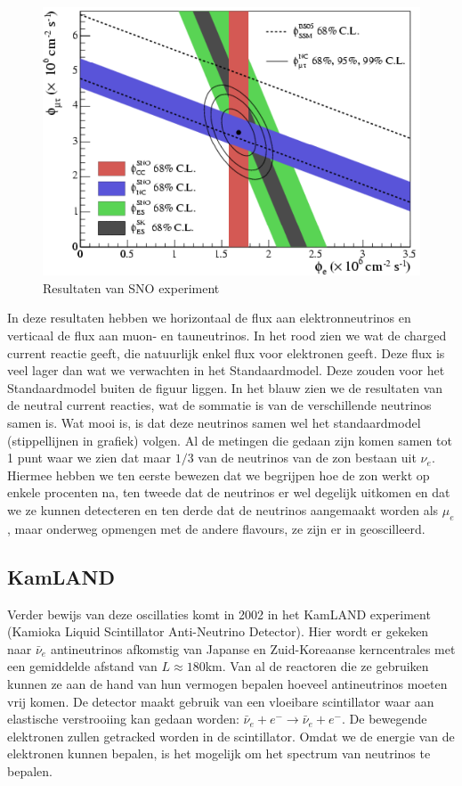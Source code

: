 \documentclass[../main.tex]{subfiles}
\begin{document}
\begin{figure}[h]
    \centering
    \includegraphics[width=0.5\linewidth]{neutrinos/sno_resultaten.png}
    \caption{Resultaten van SNO experiment}%
    \label{fig:neutrinos/sno_resultaten}
\end{figure}

In deze resultaten hebben we horizontaal de flux aan elektronneutrinos en verticaal de flux aan muon- en tauneutrinos. In het rood zien we wat de charged current reactie geeft, die natuurlijk enkel flux voor elektronen geeft. Deze flux is veel lager dan wat we verwachten in het Standaardmodel. Deze zouden voor het Standaardmodel buiten de figuur liggen. In het blauw zien we de resultaten van de neutral current reacties, wat de sommatie is van de verschillende neutrinos samen is. Wat mooi is, is dat deze neutrinos samen wel het standaardmodel (stippellijnen in grafiek) volgen. Al de metingen die gedaan zijn komen samen tot 1 punt waar we zien dat maar $1/3$ van de neutrinos van de zon bestaan uit $\nu_e$.\\
Hiermee hebben we ten eerste bewezen dat we begrijpen hoe de zon werkt op enkele procenten na, ten tweede dat de neutrinos er wel degelijk uitkomen en dat we ze kunnen detecteren en ten derde dat de neutrinos aangemaakt worden als $\mu_e$, maar onderweg opmengen met de andere flavours, ze zijn er in geoscilleerd.

\subsection{KamLAND}%
\label{sub:kamland}

Verder bewijs van deze oscillaties komt in 2002 in het KamLAND experiment (Kamioka Liquid Scintillator Anti-Neutrino
Detector). Hier wordt er gekeken naar $\bar{\nu}_e$ antineutrinos afkomstig van Japanse en Zuid-Koreaanse kerncentrales met een gemiddelde afstand van $L\approx180$km. Van al de reactoren die ze gebruiken kunnen ze aan de hand van hun vermogen bepalen hoeveel antineutrinos moeten vrij komen. De detector maakt gebruik van een vloeibare scintillator waar aan elastische verstrooiing kan gedaan worden: $\bar{\nu}_{e}+e^{-} \rightarrow \bar{\nu}_{e}+e^{-}$. De bewegende elektronen zullen getracked worden in de scintillator. Omdat we de energie van de elektronen kunnen bepalen, is het mogelijk om het spectrum van neutrinos te bepalen.
\end{document}
